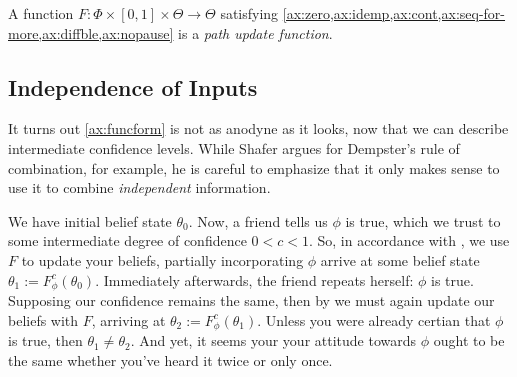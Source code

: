 
\begin{defn}
	A function $F: \Phi \times [0,1] \times \Theta \to \Theta$ 
	satisfying
	\cref{ax:zero,ax:idemp,ax:cont,ax:seq-for-more,ax:diffble,ax:nopause}
	is 
	a \emph{path update function}.
\end{defn}




\subsection{Independence of Inputs}
It turns out \cref{ax:funcform} is not as anodyne as it
looks, now that we can describe intermediate confidence levels. 
While Shafer argues for Dempster's rule of combination, for example,
he is careful to emphasize that it only makes sense to use it
to combine \emph{independent} information.

\begin{example}\label{ex:dupl}
	We have initial belief state $\theta_0$.
	Now, a friend tells us $\phi$ is true, 
	which we trust to some intermediate degree of confidence 
	$0 < c < 1$. 
	So, in accordance with , we use $F$ to update your beliefs, partially incorporating $\phi$ arrive at some belief state $\theta_1 := F^c_\phi(\theta_0)$.
	Immediately afterwards, the friend repeats herself: $\phi$ is true.
	Supposing our
 	confidence remains the same,
	then by 
	we must again update our beliefs with $F$,
	arriving at $\theta_2 := F^c_\phi(\theta_1)$.
	Unless you were already certian that $\phi$ is true, then $\theta_1 \ne \theta_2$.
	And yet, it seems your your attitude towards $\phi$ ought to be the same whether you've heard it twice or only once.
\end{example}

